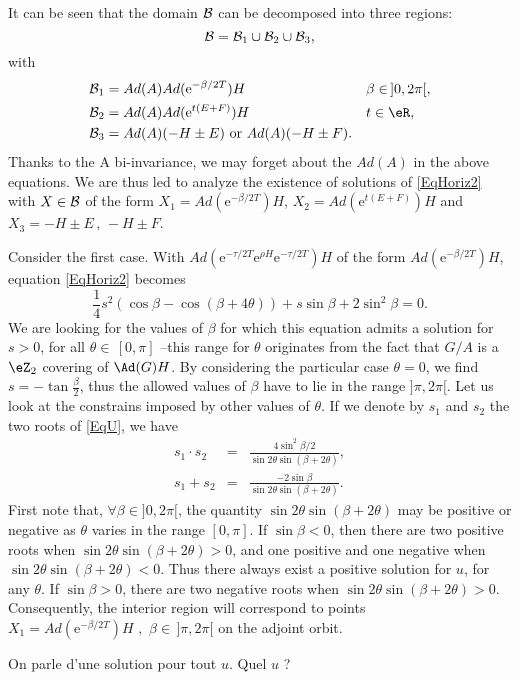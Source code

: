 			It can be seen that the domain ${\cal B}$ can be decomposed into three regions:
			\begin{equation}
				{\cal B} = {\cal B}_1 \cup {\cal B}_2 \cup {\cal B}_3,
			\end{equation}
			with
			\begin{subequations}
				\begin{align}
					{\cal B}_1 & =Ad(A)Ad(\mbox{e}^{-\beta/2 T})H                &  & \beta \in \, ]0,2\pi[, \\
					{\cal B}_2 & =Ad(A)Ad(\mbox{e}^{t (E+F)})H                   &  & t\in \eR,              \\
					{\cal B}_3 & =Ad(A)(-H \pm E) \textrm{ or } Ad(A)(-H \pm F).
				\end{align}
			\end{subequations}
			Thanks to the A bi-invariance, we may forget about the $Ad(A)$ in the above equations. We are thus led to analyze the existence of solutions of \eqref{EqHoriz2} with $X \in {\cal B}$ of the form $X_1 = Ad(\mbox{e}^{-\beta/2 T})H$, $X_2 =Ad(\mbox{e}^{t (E+F)})H$ and $X_3 =-H \pm E \, , \, -H \pm F$.

			Consider the first case. With $ Ad(\mbox{e}^{-\tau/2 T} \mbox{e}^{\rho H} \mbox{e}^{-\tau/2 T}) H$ of the form $Ad(\mbox{e}^{-\beta/2 T})H$, equation \eqref{EqHoriz2} becomes
			\begin{equation}  \label{EqU}
				\frac{1}{4} s^2 (\cos \beta - \cos(\beta + 4\theta)) + s \sin
				\beta  + 2 \sin^2 \beta = 0.
			\end{equation}
			We are looking for the values of $\beta$ for which this equation admits a solution for $s>0$, for all $\theta \in \, [0,\pi]$ --this range for $\theta$ originates from the fact that $G/A$ is a $\eZ_2$ covering of $\Ad(G)H$.  By considering the particular case $\theta = 0$, we find $s=-\tan \frac{\beta}{2}$, thus the allowed values of $\beta$ have to lie in the range $]\pi,2\pi[$. Let us look at the constrains imposed by other values of $\theta$. If we denote by $s_1$ and $s_2$ the two roots of \eqref{EqU}, we have
			\begin{eqnarray}
				s_1\cdot s_2 &=& \frac{4 \sin^2 \beta/2}{\sin 2\theta \sin(\beta +
					2 \theta)}, \label{PrRac} \\
				s_1 + s_2 &=& \frac{- 2 \sin \beta}{\sin 2\theta \sin(\beta +
					2\theta)}.
			\end{eqnarray}
			First note that, $\forall \beta \in ]0,2\pi[$, the quantity $\sin 2\theta \sin(\beta + 2\theta)$ may be positive or negative as $\theta$ varies in the range $[0,\pi]$. If $\sin \beta < 0$, then there are two positive roots when $\sin 2\theta \sin(\beta + 2\theta)>0$, and one positive and one negative when $\sin 2\theta \sin(\beta + 2\theta)<0$. Thus there always exist a positive solution for $u$, for any $\theta$. If $\sin \beta > 0$, there are two negative roots when $\sin 2\theta \sin(\beta + 2\theta)>0$. Consequently, the interior region will correspond to points $X_1 = Ad(\mbox{e}^{-\beta/2 T})H \, \, , \, \, \beta \in \,]\pi , 2\pi[ $ on the adjoint orbit.
\begin{probleme}
	On parle d'une solution pour tout $u$. Quel $u$ ?
\end{probleme}

